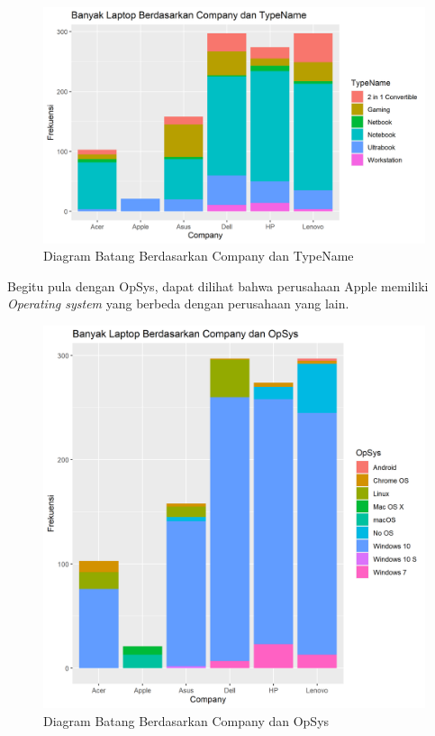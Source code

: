 \documentclass[12pt]{article}
\begin{document}
\begin{figure}[h!]
    \centering
    \includegraphics[scale = 0.4]{barplot_inter1.png}
    \caption{Diagram Batang Berdasarkan Company dan TypeName}
    \label{asdahay}
\end{figure}    
Begitu pula dengan OpSys, dapat dilihat bahwa perusahaan Apple memiliki \textit{Operating system} yang berbeda dengan perusahaan yang lain.   
  
\begin{figure}[h!]
    \centering
    \includegraphics[scale = 0.4]{interaction2.png}
    \caption{Diagram Batang Berdasarkan Company dan OpSys}
    \label{asdahay}
\end{figure}    
\end{document}
